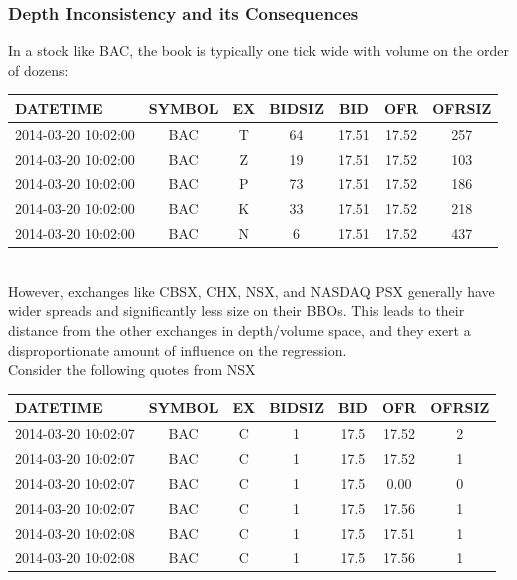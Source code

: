 \documentclass{article}
\begin{document}
\subsubsection{Depth Inconsistency and its Consequences}
In a stock like BAC, the book is typically one tick wide with volume on the order of dozens:\\
\begin{tabular}{ | l | c | c | c | c | c | c |}
\hline
DATETIME & SYMBOL & EX & BIDSIZ  & BID   & OFR & OFRSIZ \\ \hline 
2014-03-20 10:02:00   & BAC & T  &   64& 17.51& 17.52&    257         \\ \hline 
2014-03-20 10:02:00   & BAC & Z  &   19 &17.51& 17.52&    103         \\ \hline 
2014-03-20 10:02:00   & BAC & P  &   73 &17.51& 17.52&    186         \\ \hline 
2014-03-20 10:02:00   & BAC & K  &   33 &17.51& 17.52&    218         \\ \hline 
2014-03-20 10:02:00   & BAC & N  &    6 &17.51 &17.52&    437         \\ \hline 
\end{tabular}\\

However, exchanges like CBSX, CHX, NSX, and NASDAQ PSX generally have wider spreads and significantly less size on their BBOs. This leads to their distance from the other exchanges in depth/volume space, and they exert a disproportionate amount of influence on the regression.\\

Consider the following quotes from NSX\\

\begin{tabular}{ | l | c | c | c | c | c | c |}
\hline
DATETIME & SYMBOL & EX & BIDSIZ  & BID   & OFR & OFRSIZ \\ \hline 
2014-03-20 10:02:07  &   BAC &  C  &     1 & 17.5 & 17.52  &     2   \\ \hline 
2014-03-20 10:02:07  &   BAC &  C  &     1 & 17.5 & 17.52  &     1   \\ \hline 
2014-03-20 10:02:07  &   BAC &  C  &     1 & 17.5 &  0.00   &    0    \\ \hline 
2014-03-20 10:02:07  &   BAC &  C  &     1 & 17.5 & 17.56  &     1    \\ \hline 
2014-03-20 10:02:08  &   BAC &  C  &     1 & 17.5 & 17.51  &     1    \\ \hline 
2014-03-20 10:02:08  &   BAC &  C  &     1 & 17.5 & 17.56  &     1 \\ \hline 
\end{tabular}\\
\end{document}

